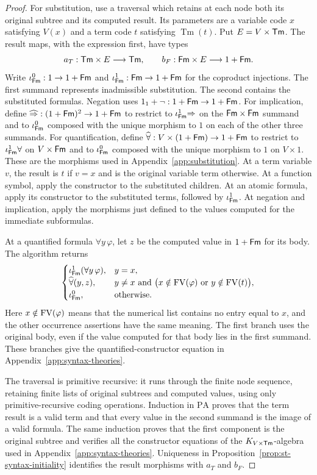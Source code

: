 \begin{proof}
For substitution, use a traversal which retains at each node both
its original subtree and its computed result. Its parameters are
a variable code $x$ satisfying $V(x)$ and a term code $t$
satisfying $\operatorname{Tm}(t)$. Put $E=V\times\mathsf{Tm}$.
The result maps, with the expression first, have types
\[
 a_T:\mathsf{Tm}\times E\longrightarrow\mathsf{Tm},\qquad
 b_F:\mathsf{Fm}\times E\longrightarrow1+\mathsf{Fm} .
\] Write
$\iota^{0}_{\mathsf{Fm}}:1\to1+\mathsf{Fm}$ and $\iota^{1}_{\mathsf{Fm}}:\mathsf{Fm}\to1+\mathsf{Fm}$ for the
coproduct injections. The first summand represents inadmissible
substitution. The second contains the substituted formulas.
Negation uses $1_1+\neg:1+\mathsf{Fm}\to1+\mathsf{Fm}$.
For implication, define
$\widehat{\Rightarrow}:(1+\mathsf{Fm})^2\to1+\mathsf{Fm}$ to restrict to
$\iota^{1}_{\mathsf{Fm}}\mathord{\Rightarrow}$ on the $\mathsf{Fm}\times\mathsf{Fm}$ summand
and to $\iota^{0}_{\mathsf{Fm}}$ composed with the unique morphism to $1$
on each of the other three summands.
For quantification, define
$\widehat\forall:V\times(1+\mathsf{Fm})\to1+\mathsf{Fm}$ to restrict to
$\iota^{1}_{\mathsf{Fm}}\forall$ on $V\times\mathsf{Fm}$ and to $\iota^{0}_{\mathsf{Fm}}$ composed
with the unique morphism to $1$ on $V\times1$.
These are the morphisms used in Appendix~\ref{app:substitution}.
At a term variable $v$, the result is $t$ if $v=x$ and is the
original variable term otherwise. At a function symbol, apply the
constructor to the substituted children. At an atomic formula,
apply its constructor to the substituted terms, followed by
$\iota^{1}_{\mathsf{Fm}}$. At negation and implication, apply the morphisms
just defined to the values computed for the immediate subformulas.

At a quantified formula $\forall y\,\varphi$, let $z$ be the
computed value in $1+\mathsf{Fm}$ for its body. The algorithm returns
\[
 \begin{cases}
  \iota^{1}_{\mathsf{Fm}}(\forall y\,\varphi),&y=x,\\
  \widehat\forall(y,z),&y\ne x\text{ and }
       \bigl(x\notin\operatorname{FV}(\varphi)
             \text{ or }y\notin\operatorname{FV}(t)\bigr),\\
  \iota^{0}_{\mathsf{Fm}},&\text{otherwise}.
 \end{cases}
\]
Here $x\notin\operatorname{FV}(\varphi)$ means that the numerical list
contains no entry equal to $x$, and the other occurrence assertions have the
same meaning. The first branch uses the original body, even if
the value computed for that body lies in the first summand. These branches give
the quantified-constructor equation in Appendix~\ref{app:syntax-theories}.

The traversal is primitive recursive: it runs through the finite
node sequence, retaining finite lists of original subtrees and
computed values, using only primitive-recursive coding operations.
Induction in $\mathrm{PA}$ proves that the term result is a valid
term and that every value in the second summand is the image of a valid formula.
The same induction proves that the first component is the original
subtree and verifies all the constructor equations of the
$K_{V\times\mathsf{Tm}}$-algebra used in Appendix~\ref{app:syntax-theories}.
Uniqueness in Proposition~\ref{prop:st-syntax-initiality} identifies
the result morphisms with $a_T$ and $b_F$.


\end{proof}
